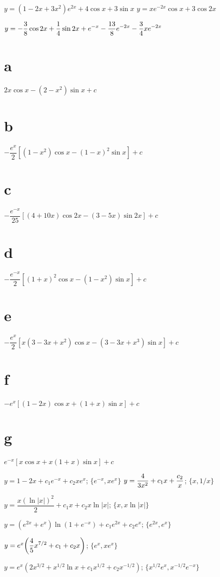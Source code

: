  $y=(1-2x+3x^2)e^{2x}+4\cos x+3\sin x$
 $y=xe^{-2x}\cos x+3\cos2x$

 $y=\displaystyle{-\frac{3}{8}\cos2x+\frac{1}{4}\sin2x+e^{-x}-\frac{13}{8}e^{-2x}-\frac{3}{4}xe^{-2x}}$

 \part{a} $2x\cos x-(2-x^2)\sin x+c$
\part{b} $-\dfrac{e^x}{2}\left[(1-x^2)\cos x-(1-x)^2\sin x
\right]+c$
\part{c} $-\dfrac{e^{-x}}{25}\left[(4+10x)\cos
2x-(3-5x)\sin2x\right]+c$
\part{d} $-\dfrac{e^{-x}}{2}\left[(1+x)^2\cos x-(1-x^2)\sin x
\right]+c$
\part{e} $-\dfrac{e^x}{2}\left[x(3-3x+x^2)\cos x-(3-3x+x^3)\sin
x\right]+c$
\part{f} $-e^x\left[(1-2x)\cos x+(1+x)\sin x\right]+c$
\part{g} $e^{-x}\left[x\cos x+x(1+x)\sin x\right]+c$



 $y=1-2x+c_1e^{-x}+c_2xe^x$;\;
$\{e^{-x},xe^x\}$
 $y=\displaystyle{\frac{4}{3x^2}+c_1x+\frac{c_2}{x}}$;\;
$\{x,1/x\}$

 $y=\dfrac{x(\ln |x|)^2}{2}+c_1x+c_2x\ln
|x|$;\;   $\{x,x\ln|x|\}$

  $y=(e^{2x}+e^x)
\ln(1+e^{-x})+c_1e^{2x}+c_2e^x$;\;   $\{e^{2x},e^x\}$

$y=e^x\displaystyle{\left(\frac{4}{5}x^{7/2}+c_1+c_2x\right)}$;\;
$\{e^x,xe^x\}$

$y=e^x(2x^{3/2}+x^{1/2}\ln x+c_1x^{1/2}+c_2x^{-1/2})$;\;
$\{x^{1/2}e^x,x^{-1/2}e^{-x}\}$

